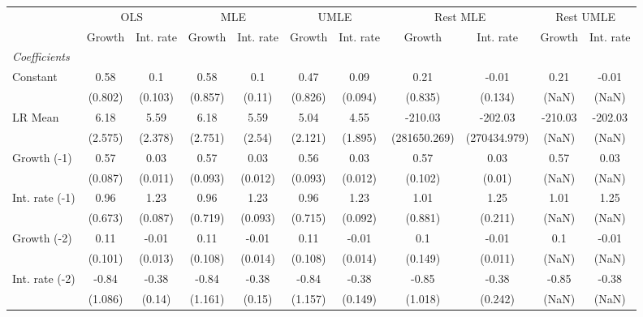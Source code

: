 \begin{table}[htbp] 
	\centering
	\begin{tabular}{@{\extracolsep{4pt}}lcccccccccc@{}}		\hline\hline
		 		 & \multicolumn{2}{c}{OLS} &\multicolumn{2}{c}{MLE} &\multicolumn{2}{c}{UMLE} &\multicolumn{2}{c}{Rest MLE} &\multicolumn{2}{c}{Rest UMLE} \\ 
 		 & Growth 	 & Int. rate 	 & Growth 	 & Int. rate 	 & Growth 	 & Int. rate 	 & Growth 	 & Int. rate 	 & Growth 	 & Int. rate\\\cline{2-3}\cline{4-5}\cline{6-7}\cline{8-9}\cline{10-11}
\rule{0pt}{4ex} 
 \emph{Coefficients} 	  		 & 		 & 		 & 		 & 		 & 		 & 		 & 		 & 		 & 		 &\\ 
\quad Constant 	 & 0.58 	 & 0.1 	 & 0.58 	 & 0.1 	 & 0.47 	 & 0.09 	 & 0.21 	 & -0.01 	 & 0.21 	 & -0.01	 \\ 
 		 & (0.802) 	 & (0.103) 	 & (0.857) 	 & (0.11) 	 & (0.826) 	 & (0.094) 	 & (0.835) 	 & (0.134) 	 & (NaN) 	 & (NaN) 	 \\ 
\quad LR Mean 	 & 6.18 	 & 5.59 	 & 6.18 	 & 5.59 	 & 5.04 	 & 4.55 	 & -210.03 	 & -202.03 	 & -210.03 	 & -202.03	 \\ 
 		 & (2.575) 	 & (2.378) 	 & (2.751) 	 & (2.54) 	 & (2.121) 	 & (1.895) 	 & (281650.269) 	 & (270434.979) 	 & (NaN) 	 & (NaN) 	 \\ 
\quad Growth (-1) 	 &0.57 	 & 0.03 	 & 0.57 	 & 0.03 	 & 0.56 	 & 0.03 	 & 0.57 	 & 0.03 	 & 0.57 	 & 0.03	 \\ 
 		 & (0.087) 	 & (0.011) 	 & (0.093) 	 & (0.012) 	 & (0.093) 	 & (0.012) 	 & (0.102) 	 & (0.01) 	 & (NaN) 	 & (NaN) 	 \\ 
\quad Int. rate (-1) 	 &0.96 	 & 1.23 	 & 0.96 	 & 1.23 	 & 0.96 	 & 1.23 	 & 1.01 	 & 1.25 	 & 1.01 	 & 1.25	 \\ 
 		 & (0.673) 	 & (0.087) 	 & (0.719) 	 & (0.093) 	 & (0.715) 	 & (0.092) 	 & (0.881) 	 & (0.211) 	 & (NaN) 	 & (NaN) 	 \\ 
\quad Growth (-2) 	 &0.11 	 & -0.01 	 & 0.11 	 & -0.01 	 & 0.11 	 & -0.01 	 & 0.1 	 & -0.01 	 & 0.1 	 & -0.01	 \\ 
 		 & (0.101) 	 & (0.013) 	 & (0.108) 	 & (0.014) 	 & (0.108) 	 & (0.014) 	 & (0.149) 	 & (0.011) 	 & (NaN) 	 & (NaN) 	 \\ 
\quad Int. rate (-2) 	 &-0.84 	 & -0.38 	 & -0.84 	 & -0.38 	 & -0.84 	 & -0.38 	 & -0.85 	 & -0.38 	 & -0.85 	 & -0.38	 \\ 
 		 & (1.086) 	 & (0.14) 	 & (1.161) 	 & (0.15) 	 & (1.157) 	 & (0.149) 	 & (1.018) 	 & (0.242) 	 & (NaN) 	 & (NaN) 	 \\ 

\end{tabular}
\end{table}

